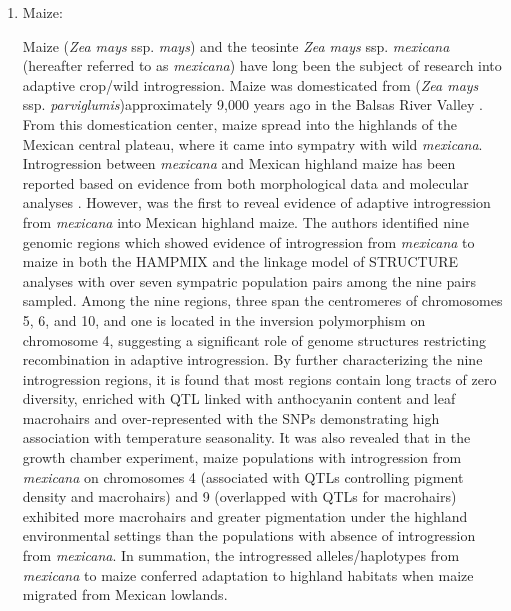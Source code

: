 \documentclass[11pt]{article}
\begin{document}
\begin{enumerate}
\item{Maize:}






Maize (\emph{Zea mays} ssp. \emph{mays}) and the teosinte \emph{Zea mays} ssp. \emph{mexicana} (hereafter referred to as \emph{mexicana}) have long been the subject of research into adaptive crop/wild introgression.
Maize was domesticated from (\emph{Zea mays} ssp. \emph{parviglumis})approximately 9,000 years ago in the Balsas River Valley \cite{matsuoka2002single}.
From this domestication center, maize spread into the highlands of the Mexican central plateau, where it came into sympatry with wild \emph{mexicana}.
Introgression between \emph{mexicana} and Mexican highland maize has been reported based on evidence from both morphological data \cite {wilkes1977, lauter2004, doebley1984} and molecular analyses \cite{matsuoka2002, vanHeerwaarden2011, doebley1987, warburton2011, fukunaga2005}.
However, \citep{hufford2013} was the first to reveal evidence of adaptive introgression from \emph{mexicana} into Mexican highland maize.
The authors identified nine genomic regions which showed evidence of introgression from \emph{mexicana} to maize in both the HAMPMIX and the linkage model of STRUCTURE analyses with over seven sympatric population pairs among the nine pairs sampled.
Among the nine regions, three span the centromeres of chromosomes 5, 6, and 10, and one is located in the inversion polymorphism on chromosome 4, suggesting a significant role of genome structures restricting recombination in adaptive introgression.
By further characterizing the nine introgression regions, it is found that most regions contain long tracts of zero diversity, enriched with QTL linked with anthocyanin content and leaf macrohairs \cite{lauter2004} and over-represented with the SNPs demonstrating high association with temperature seasonality.
It was also revealed that in the growth chamber experiment, maize populations with introgression from \emph{mexicana} on chromosomes 4 (associated with QTLs controlling pigment density and macrohairs) and 9 (overlapped with QTLs for macrohairs) exhibited more macrohairs and greater pigmentation under the highland environmental settings than the populations with absence of introgression from \emph{mexicana}.
In summation, the introgressed alleles/haplotypes from \emph{mexicana} to maize conferred adaptation to highland habitats when maize migrated from Mexican lowlands.



\end{enumerate}
\end{document}
